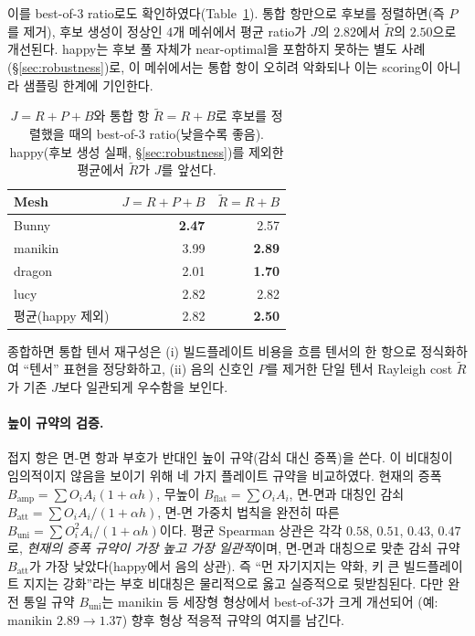 \documentclass[11pt,a4paper]{article}
\begin{document}
이를 best-of-3 ratio로도 확인하였다(Table~\ref{tab:unified-b3}).
통합 항만으로 후보를 정렬하면(즉 $P$를 제거),
후보 생성이 정상인 4개 메쉬에서 평균 ratio가 $J$의 $2.82$에서 $\tilde R$의 $2.50$으로 개선된다.
happy는 후보 풀 자체가 near-optimal을 포함하지 못하는 별도 사례(\S\ref{sec:robustness})로,
이 메쉬에서는 통합 항이 오히려 악화되나 이는 scoring이 아니라 샘플링 한계에 기인한다.

\begin{table}[H]
\centering
\caption{$J=R+P+B$와 통합 항 $\tilde R=R+B$로 후보를 정렬했을 때의 best-of-3 ratio(낮을수록 좋음).
happy(후보 생성 실패, \S\ref{sec:robustness})를 제외한 평균에서 $\tilde R$가 $J$를 앞선다.}
\label{tab:unified-b3}
\begin{tabular}{lrr}
\toprule
Mesh & $J=R{+}P{+}B$ & $\tilde R=R{+}B$\\
\midrule
Bunny   & \textbf{2.47} & 2.57\\
manikin & 3.99 & \textbf{2.89}\\
dragon  & 2.01 & \textbf{1.70}\\
lucy    & 2.82 & 2.82\\
\midrule
평균(happy 제외) & 2.82 & \textbf{2.50}\\
\bottomrule
\end{tabular}
\end{table}

종합하면 통합 텐서 재구성은 (i) 빌드플레이트 비용을 흐름 텐서의 한 항으로 정식화하여
``텐서'' 표현을 정당화하고, (ii) 음의 신호인 $P$를 제거한 단일 텐서 Rayleigh cost $\tilde R$가
기존 $J$보다 일관되게 우수함을 보인다.

\paragraph{높이 규약의 검증.}
접지 항은 면-면 항과 부호가 반대인 높이 규약(감쇠 대신 증폭)을 쓴다.
이 비대칭이 임의적이지 않음을 보이기 위해 네 가지 플레이트 규약을 비교하였다.
현재의 증폭 $B_{\mathrm{amp}}=\sum O_iA_i(1+\alpha h)$,
무높이 $B_{\mathrm{flat}}=\sum O_iA_i$,
면-면과 대칭인 감쇠 $B_{\mathrm{att}}=\sum O_iA_i/(1+\alpha h)$,
면-면 가중치 법칙을 완전히 따른 $B_{\mathrm{uni}}=\sum O_i^2A_i/(1+\alpha h)$이다.
평균 Spearman 상관은 각각 $0.58$, $0.51$, $0.43$, $0.47$로,
\emph{현재의 증폭 규약이 가장 높고 가장 일관적}이며,
면-면과 대칭으로 맞춘 감쇠 규약 $B_{\mathrm{att}}$가 가장 낮았다(happy에서 음의 상관).
즉 ``먼 자기지지는 약화, 키 큰 빌드플레이트 지지는 강화''라는 부호 비대칭은
물리적으로 옳고 실증적으로 뒷받침된다.
다만 완전 통일 규약 $B_{\mathrm{uni}}$는 manikin 등 세장형 형상에서 best-of-3가 크게 개선되어
(예: manikin $2.89\to1.37$) 향후 형상 적응적 규약의 여지를 남긴다.
\end{document}
